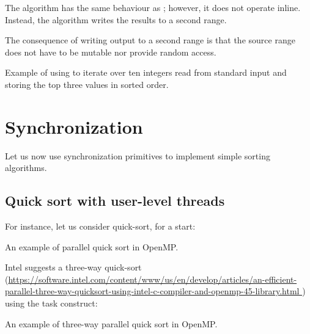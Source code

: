 The  algorithm has the same behaviour as \linebreak{}; however, it does not operate inline. Instead, the algorithm writes the results to a second range.


The consequence of writing output to a second range is that the source range does not have to be mutable nor provide random access.

\begin{codebox}[]{\href{https://compiler-explorer.com/z/vjKc5nY31}{\ExternalLink}}
\footnotesize Example of using  to iterate over ten integers read from standard input and storing the top three values in sorted order.
\tcblower
{}
\end{codebox}

\section{Synchronization}

Let us now use synchronization primitives to implement simple sorting algorithms. 

\subsection{Quick sort with user-level threads}

For instance, let us consider quick-sort, for a start:

\begin{codebox}[breakable]{}
\footnotesize An example of parallel quick sort in OpenMP.
\tcblower
{}
\end{codebox}

Intel suggests a three-way quick-sort (\url{https://software.intel.com/content/www/us/en/develop/articles/an-efficient-parallel-three-way-quicksort-using-intel-c-compiler-and-openmp-45-library.html
}) using the task construct:

\begin{codebox}[breakable]{}
\footnotesize An example of three-way parallel quick sort in OpenMP.
\tcblower
{}
\end{codebox}

